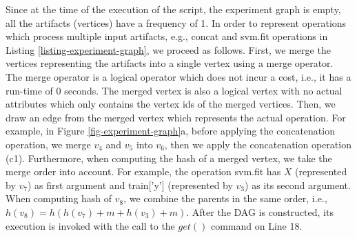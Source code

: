 Since at the time of the execution of the script, the experiment graph is empty, all the artifacts (vertices) have a frequency of 1.
In order to represent operations which process multiple input artifacts, e.g., concat and svm.fit operations in Listing \ref{listing-experiment-graph}, we proceed as follows.
First, we merge the vertices representing the artifacts into a single vertex using a merge operator.
The merge operator is a logical operator which does not incur a cost, i.e., it has a run-time of 0 seconds.
The merged vertex is also a logical vertex with no actual attributes which only contains the vertex ids of the merged vertices.
Then, we draw an edge from the merged vertex which represents the actual operation.
For example, in Figure \ref{fig-experiment-graph}a, before applying the concatenation operation, we merge $v_4$ and $v_5$ into $v_6$, then we apply the concatenation operation (c1).
Furthermore, when computing the hash of a merged vertex, we take the merge order into account.
For example, the operation svm.fit has $X$ (represented by $v_7$) as first argument and train['y'] (represented by $v_3$) as its second argument.
When computing hash of $v_8$, we combine the parents in the same order, i.e., $h(v_8) = h(h(v_7) + m + h(v_3) + m)$. 
After the DAG is constructed, its execution is invoked with the call to the $get()$ command on Line 18.
